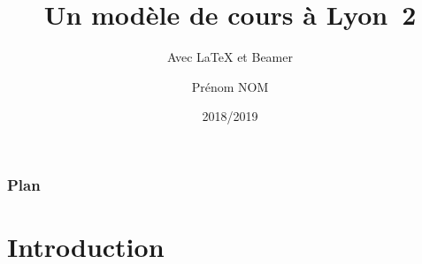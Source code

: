 \documentclass[10pt,t]{beamer}
\title{Un modèle de cours à Lyon~2}
\subtitle{Avec \LaTeX{} et Beamer}
\author{Prénom NOM}
\institute{Université Lyon~2}
\date{2018/2019}
\begin{document}
\maketitle[label=titre]

\begin{frame}
  \frametitle{Plan}
  \tableofcontents %
\end{frame}


\section*{Introduction}

\end{document}
